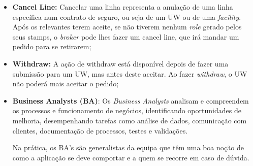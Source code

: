 \begin{itemize}
            \item \textbf{Cancel Line:} Cancelar uma linha representa a anulação de uma linha específica num contrato de seguro, ou seja de um UW ou de uma \textit{facility}. Após os relevantes terem aceite, se não tiverem nenhum \textit{role} gerado pelos seus stamps, o \textit{broker} pode lhes fazer um cancel line, que irá mandar um pedido para se retirarem;
            
            \item \textbf{Withdraw:} A ação de withdraw está disponível depois de fazer uma submissão para um UW, mas antes deste aceitar. Ao fazer \textit{withdraw}, o UW não poderá mais aceitar o pedido;

            \item \textbf{Business Analysts (BA)}: Os \textit{Business Analysts} analisam e compreendem os processos e funcionamento de negócios, identificando oportunidades de melhoria, desempenhando tarefas como análise de dados, comunicação com clientes, documentação de processos, testes e validações. 

            Na prática, os BA's são generalistas da equipa que têm uma boa noção de como a aplicação se deve comportar e a quem se recorre em caso de dúvida.
           
        \end{itemize}